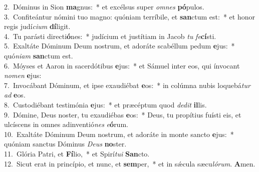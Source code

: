 {2.~}Dóminus in Sion \textbf{ma}gnus:~* et excélsus super \textit{om}\textit{nes} \textbf{pó}pulos.\\
{3.~}Confiteántur nómini tuo magno: quóniam terríbile, et \textbf{san}ctum est:~* et honor regis judí\textit{ci}\textit{um} \textbf{dí}ligit.\\
{4.~}Tu parásti directi\textbf{ó}nes:~* judícium et justítiam in Jacob \textit{tu} \textit{fe}\textbf{cí}sti.\\
{5.~}Exaltáte Dóminum Deum nostrum, et adoráte scabéllum pedum \textbf{e}jus:~* quó\textit{ni}\textit{am} \textbf{san}ctum est.\\
{6.~}Móyses et Aaron in sacerdótibus \textbf{e}jus:~* et Sámuel inter eos, qui ínvocant \textit{no}\textit{men} \textbf{e}jus:\\
{7.~}Invocábant Dóminum, et ipse exaudiébat \textbf{e}os:~* in colúmna nubis loquebá\textit{tur} \textit{ad} \textbf{e}os.\\
{8.~}Custodiébant testimónia \textbf{e}jus:~* et præcéptum quod \textit{de}\textit{dit} \textbf{il}lis.\\
{9.~}Dómine, Deus noster, tu exaudiébas \textbf{e}os:~* Deus, tu propítius fuísti eis, et ulcíscens in omnes adinventió\textit{nes} \textit{e}\textbf{ó}rum.\\
{10.~}Exaltáte Dóminum Deum nostrum, et adoráte in monte sancto \textbf{e}jus:~* quóniam sanctus Dóminus \textit{De}\textit{us} \textbf{no}ster.\\
{11.~}Glória Patri, et \textbf{Fí}lio,~* et Spirí\textit{tu}\textit{i} \textbf{San}cto.\\
{12.~}Sicut erat in princípio, et nunc, et \textbf{sem}per,~* et in sǽcula sæcu\textit{ló}\textit{rum}. \textbf{A}men.\\
